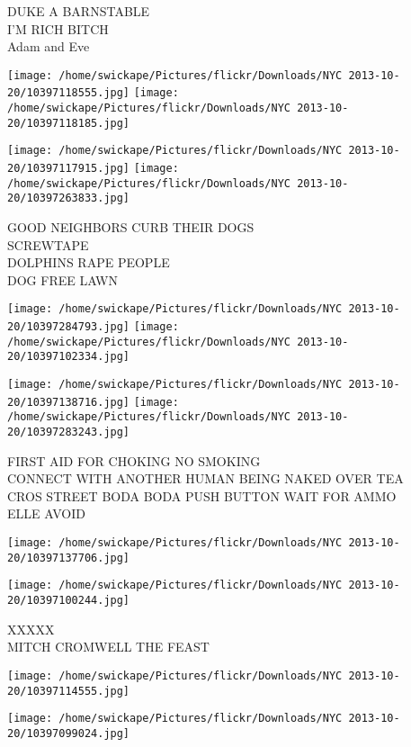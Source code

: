 \documentclass[10pt,letterpaper]{article}
\begin{document}
DUKE A BARNSTABLE\\
I'M RICH BITCH\\
Adam and Eve\\
\pagebreak

\texttt{[image: /home/swickape/Pictures/flickr/Downloads/NYC 2013-10-20/10397118555.jpg]}
\texttt{[image: /home/swickape/Pictures/flickr/Downloads/NYC 2013-10-20/10397118185.jpg]}

\texttt{[image: /home/swickape/Pictures/flickr/Downloads/NYC 2013-10-20/10397117915.jpg]}
\texttt{[image: /home/swickape/Pictures/flickr/Downloads/NYC 2013-10-20/10397263833.jpg]}

GOOD NEIGHBORS CURB THEIR DOGS\\
SCREWTAPE\\
DOLPHINS RAPE PEOPLE\\
DOG FREE LAWN\\
\pagebreak

\texttt{[image: /home/swickape/Pictures/flickr/Downloads/NYC 2013-10-20/10397284793.jpg]}
\texttt{[image: /home/swickape/Pictures/flickr/Downloads/NYC 2013-10-20/10397102334.jpg]}

\texttt{[image: /home/swickape/Pictures/flickr/Downloads/NYC 2013-10-20/10397138716.jpg]}
\texttt{[image: /home/swickape/Pictures/flickr/Downloads/NYC 2013-10-20/10397283243.jpg]}

FIRST AID FOR CHOKING NO SMOKING\\
CONNECT WITH ANOTHER HUMAN BEING NAKED OVER TEA\\
CROS STREET BODA BODA PUSH BUTTON WAIT FOR AMMO\\
ELLE AVOID\\
\pagebreak

\texttt{[image: /home/swickape/Pictures/flickr/Downloads/NYC 2013-10-20/10397137706.jpg]}

\vspace{0.25in}
\texttt{[image: /home/swickape/Pictures/flickr/Downloads/NYC 2013-10-20/10397100244.jpg]}

XXXXX\\
MITCH CROMWELL THE FEAST\\
\pagebreak

\texttt{[image: /home/swickape/Pictures/flickr/Downloads/NYC 2013-10-20/10397114555.jpg]}

\vspace{0.25in}
\texttt{[image: /home/swickape/Pictures/flickr/Downloads/NYC 2013-10-20/10397099024.jpg]}
\end{document}
